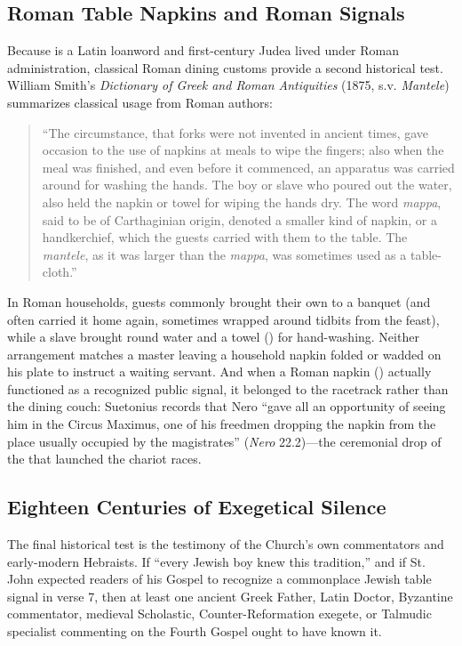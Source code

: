 \subsection{Roman Table Napkins and Roman Signals}

Because  is a Latin loanword and first-century Judea lived under Roman administration, classical Roman dining customs provide a second historical test. William Smith's \emph{Dictionary of Greek and Roman Antiquities} (1875, s.v. \emph{Mantele}) summarizes classical usage from Roman authors:
\begin{quote}
``The circumstance, that forks were not invented in ancient times, gave occasion to the use of napkins at meals to wipe the fingers; also when the meal was finished, and even before it commenced, an apparatus was carried around for washing the hands. The boy or slave who poured out the water, also held the napkin or towel for wiping the hands dry. The word \emph{mappa}, said to be of Carthaginian origin, denoted a smaller kind of napkin, or a handkerchief, which the guests carried with them to the table. The \emph{mantele}, as it was larger than the \emph{mappa}, was sometimes used as a table-cloth.''
\end{quote}
In Roman households, guests commonly brought their own  to a banquet (and often carried it home again, sometimes wrapped around tidbits from the feast), while a slave brought round water and a towel () for hand-washing. Neither arrangement matches a master leaving a household napkin folded or wadded on his plate to instruct a waiting servant. And when a Roman napkin () actually functioned as a recognized public signal, it belonged to the racetrack rather than the dining couch: Suetonius records that Nero ``gave all an opportunity of seeing him in the Circus Maximus, one of his freedmen dropping the napkin from the place usually occupied by the magistrates'' (\emph{Nero} 22.2)---the ceremonial drop of the  that launched the chariot races.

\subsection{Eighteen Centuries of Exegetical Silence}

The final historical test is the testimony of the Church's own commentators and early-modern Hebraists. If ``every Jewish boy knew this tradition,'' and if St. John expected readers of his Gospel to recognize a commonplace Jewish table signal in verse 7, then at least one ancient Greek Father, Latin Doctor, Byzantine commentator, medieval Scholastic, Counter-Reformation exegete, or Talmudic specialist commenting on the Fourth Gospel ought to have known it.

